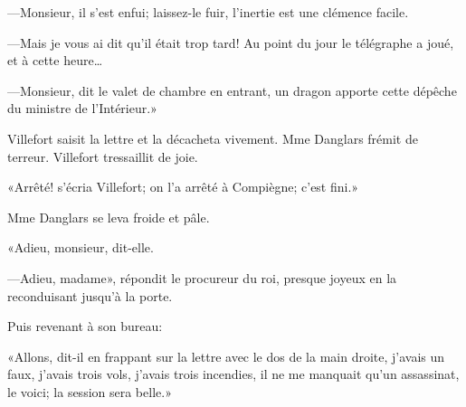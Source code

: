 —Monsieur, il s'est enfui; laissez-le fuir, l'inertie est une clémence facile. 

—Mais je vous ai dit qu'il était trop tard! Au point du jour le télégraphe a joué, et à cette heure\dots 

—Monsieur, dit le valet de chambre en entrant, un dragon apporte cette dépêche du ministre de l'Intérieur.» 

Villefort saisit la lettre et la décacheta vivement. Mme Danglars frémit de terreur. Villefort tressaillit de joie. 

«Arrêté! s'écria Villefort; on l'a arrêté à Compiègne; c'est fini.» 

Mme Danglars se leva froide et pâle. 

«Adieu, monsieur, dit-elle. 

—Adieu, madame», répondit le procureur du roi, presque joyeux en la reconduisant jusqu'à la porte. 

Puis revenant à son bureau: 

«Allons, dit-il en frappant sur la lettre avec le dos de la main droite, j'avais un faux, j'avais trois vols, j'avais trois incendies, il ne me manquait qu'un assassinat, le voici; la session sera belle.» 